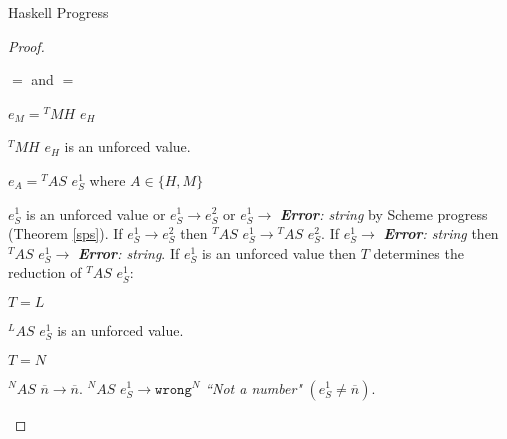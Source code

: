 \begin{theorem}{Haskell Progress}
\begin{proof}
\begin{case}{\pshm}
\begin{subcase}{\first{\vartyh} $=$ \x and \first{\vartym} $=$ \y}
\psvaleqm
{\first{\varexpm}}
{\tyfor{\second{\tyvarm}}{\third{\vartym}}}
{\z}
\psred
{\exphm{(\x)}{(\y)}{(\z)}}
{\exptabs{\first{\tyvarh}}{\exphm{\second{\vartyh}}{\tysubst{\second{\vartym}}{\tylump}{\first{\tyvarm}}}{\expsubst{\second{\varexpm}}{\tylump}{\second{\tyvarm}}}}}

\end{subcase}

\pssub
{\first{\varexpm}}
{\second{\varexpm}}
{\pshm}
{\exphm{\first{\vartyh}}{\first{\vartym}}{\second{\varexpm}}}
\pserr
{\first{\varexpm}}
{\pshm}

\end{case}


\begin{case}

$e_{M}={^{T}M}H$ $e_{H}$

$^{T}MH$ $e_{H}$ is an unforced value.

\end{case}


\begin{case}

$e_{A}={^{T}A}S$ $e_{S}^{1}$ where $A\in\lbrace H,M\rbrace$

$e_{S}^{1}$ is an unforced value or $e_{S}^{1}\rightarrow e_{S}^{2}$ or $e_{S}^{1}\rightarrow$ \emph{\textbf{Error}: string} by Scheme progress (Theorem \ref{sps}).  If $e_{S}^{1}\rightarrow e_{S}^{2}$ then $^{T}AS$ $e_{S}^{1}\rightarrow{^{T}A}S$ $e_{S}^{2}$.  If $e_{S}^{1}\rightarrow$ \emph{\textbf{Error}: string} then $^{T}AS$ $e_{S}^{1}\rightarrow$ \emph{\textbf{Error}: string}.  If $e_{S}^{1}$ is an unforced value then $T$ determines the reduction of $^{T}AS$ $e_{S}^{1}$:

\begin{subcase}

$T=L$

$^{L}AS$ $e_{S}^{1}$ is an unforced value.

\end{subcase}

\begin{subcase}

$T=N$

$^{N}AS$ $\overline{n}\rightarrow\overline{n}$.  $^{N}AS$ $e_{S}^{1}\rightarrow\mathtt{wrong}^{N}$ \emph{``Not a number"} $(e_{S}^{1}\neq\overline{n})$.

\end{subcase}


\end{case}
\end{proof}
\end{theorem}
